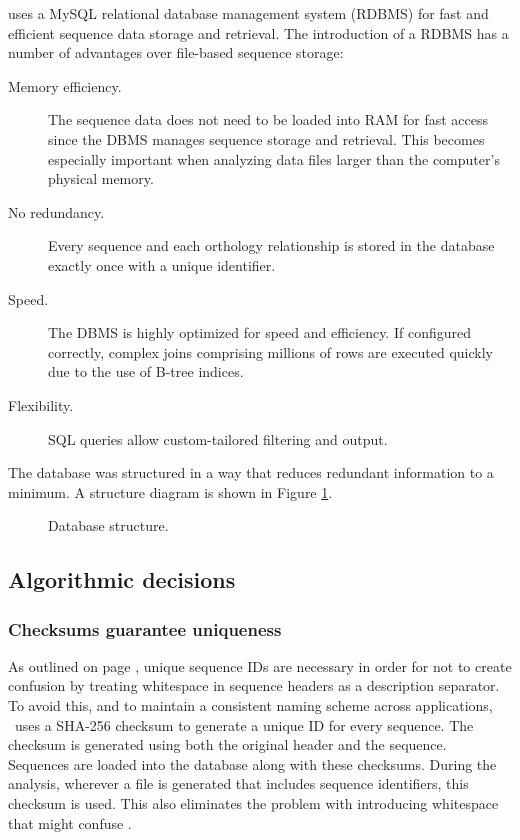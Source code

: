 \pname uses a MySQL relational database management system (RDBMS) for fast and
efficient sequence data storage and retrieval. The introduction of a RDBMS has a
number of advantages over file-based sequence storage:

\begin{description}
	\item[Memory efficiency.] The sequence data does not need to be loaded into
		RAM for fast access since the DBMS manages sequence storage and retrieval.
		This becomes especially important when analyzing data files larger than the
		computer's physical memory.
	\item[No redundancy.] Every sequence and each orthology relationship is stored
		in the database exactly once with a unique identifier. 
	\item[Speed.] The DBMS is highly optimized for speed and efficiency. If
		configured correctly, complex joins comprising millions of rows are
		executed quickly due to the use of B-tree indices.  %
	\item[Flexibility.] SQL queries allow custom-tailored filtering and output.
\end{description}

The database was structured in a way that reduces redundant information to a
minimum. A structure diagram is shown in Figure \ref{fig:dbstructure}.

\begin{figure}[ht]
	\begin{center}
	\end{center}
	\caption{Database structure.}
	\label{fig:dbstructure}
\end{figure}

\subsection{Algorithmic decisions}

\subsubsection{Checksums guarantee uniqueness}

As outlined on page \pageref{uniq}, unique sequence IDs are necessary in
order for  not to create confusion by treating whitespace in
sequence headers as a description separator. To avoid this, and to maintain a
consistent naming scheme across applications, \pname~uses a SHA-256 checksum to
generate a unique ID for every sequence. The checksum is generated using both
the original header and the sequence. Sequences are loaded into the database
along with these checksums. During the analysis, wherever a file is generated
that includes sequence identifiers, this checksum is used. This also eliminates
the problem with  introducing whitespace that might confuse
.

